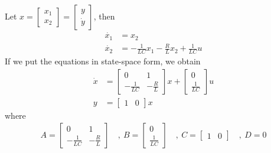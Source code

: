 \documentclass[twoside]{article}
\begin{document}
Let $x = \left[ \begin{array}{c} x_1 \\ x_2 \end{array} \right] = \left[ \begin{array}{c} y \\ \dot{y} \end{array} \right]$, then 
%
\begin{align*}
	\dot{x_1} &= x_2 \\
	\dot{x_2} &= -\frac{1}{LC} x_1 - \frac{R}{L} x_2 + \frac{1}{LC} u
\end{align*}
%
If we put the equations in state-space form, we obtain
%
\begin{align*}
 \dot{x} &= \left[  \begin{array}{cc} 0 & 1 \\ -\frac{1}{LC} &  -\frac{R}{L}  \end{array} \right] x 
 +  \left[  \begin{array}{c} 0 \\ \frac{1}{LC} \end{array} \right] u
 \\
 y &= \left[  \begin{array}{cc} 1 & 0 \end{array} \right] x 
\end{align*}
%
where
%
\begin{align*}
 A = \left[  \begin{array}{cc} 0 & 1 \\ -\frac{1}{LC} &  -\frac{R}{L}  \end{array} \right] \quad , \
 B = \left[  \begin{array}{c} 0 \\ \frac{1}{LC} \end{array} \right]  \quad , \
 C = \left[  \begin{array}{cc} 1 & 0 \end{array} \right] \quad , \
 D = 0
\end{align*}
\end{document}
